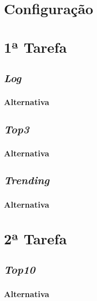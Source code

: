 \documentclass[a4paper]{report}
\begin{document}
{    \section{Configuração} \label{sec:Configuration}
    
	\section{1ª Tarefa} \label{sec:Task1}


		\subsection{\textit{Log}} \label{subsec:Task1-Log}
			\subsubsection{Alternativa} \label{sssec:Task1-Log-Alternativa}

		\subsection{\textit{Top3}} \label{subsec:Task1-Top3}
			\subsubsection{Alternativa} \label{sssec:Task1-Top3-Alternativa} 

		\subsection{\textit{Trending}} \label{subsec:Task1-Trending}
			\subsubsection{Alternativa} \label{sssec:Task1-Trending-Alternativa}

	\section{2ª Tarefa} \label{sec:Task2}


	\subsection{\textit{Top10}} \label{subsec:Task2-Top10}
		

		\subsubsection{Alternativa} \label{sssec:Task2-Top10-Alternativa}

}
\end{document}
